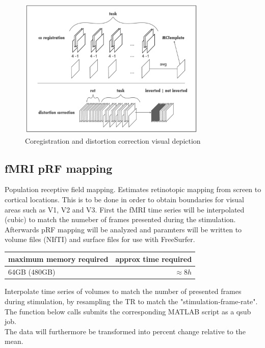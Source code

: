 \documentclass[12pt,a4paper]{scrartcl}
\begin{document}
\begin{figure}
\begin{center}
\includegraphics[width=0.8\textwidth]{coregdist}
\caption[Coregistration and distortion correction visual depiction]{Coregistration and distortion correction visual depiction}
\label{fig:coregdist}
\end{center}
\end{figure}

\subsection{fMRI pRF mapping}
Population receptive field mapping. Estimates retinotopic mapping from screen to cortical locations. This is to be done in order to obtain boundaries for visual areas such as V1, V2 and V3. First the fMRI time series will be interpolated (cubic) to match the numeber of frames presented during the stimulation. Afterwards pRF mapping will be analyzed and paramters will be written to volume files (NIfTI) and surface files for use with FreeSurfer.
\begin{table}[h]
\begin{tabular}{l | r}
\toprule
maximum memory required & approx time required\\\toprule
64GB (480GB) & $\approx 8h$ \\\bottomrule
\end{tabular}
\end{table}
\FloatBarrier
\noindent Interpolate time series of volumes to match the number of presented frames during stimulation, by resampling the TR to match the "stimulation-frame-rate". The function below calls submits the corresponding MATLAB script as a qsub job.\\
The data will furthermore be transformed into percent change relative to the mean.\\
\end{document}
